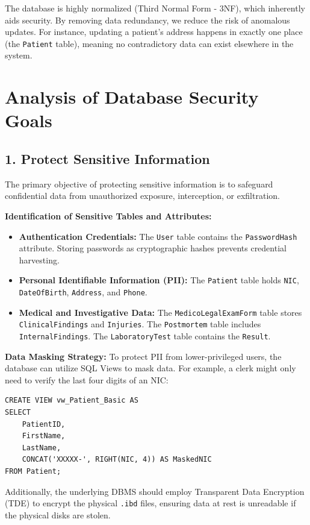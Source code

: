 \documentclass[12pt,a4paper]{article}
\begin{document}
The database is highly normalized (Third Normal Form - 3NF), which inherently aids security. By removing data redundancy, we reduce the risk of anomalous updates. For instance, updating a patient's address happens in exactly one place (the \texttt{Patient} table), meaning no contradictory data can exist elsewhere in the system.

\section{Analysis of Database Security Goals}

\subsection{1. Protect Sensitive Information}
The primary objective of protecting sensitive information is to safeguard confidential data from unauthorized exposure, interception, or exfiltration.

\textbf{Identification of Sensitive Tables and Attributes:}
\begin{itemize}
    \item \textbf{Authentication Credentials:} The \texttt{User} table contains the \texttt{PasswordHash} attribute. Storing passwords as cryptographic hashes prevents credential harvesting.
    \item \textbf{Personal Identifiable Information (PII):} The \texttt{Patient} table holds \texttt{NIC}, \texttt{DateOfBirth}, \texttt{Address}, and \texttt{Phone}.
    \item \textbf{Medical and Investigative Data:} The \texttt{MedicoLegalExamForm} table stores \texttt{ClinicalFindings} and \texttt{Injuries}. The \texttt{Postmortem} table includes \texttt{InternalFindings}. The \texttt{LaboratoryTest} table contains the \texttt{Result}.
\end{itemize}

\textbf{Data Masking Strategy:}
To protect PII from lower-privileged users, the database can utilize SQL Views to mask data. For example, a clerk might only need to verify the last four digits of an NIC:
\begin{lstlisting}[caption={SQL View for Masking Patient NIC}]
CREATE VIEW vw_Patient_Basic AS
SELECT 
    PatientID, 
    FirstName, 
    LastName, 
    CONCAT('XXXXX-', RIGHT(NIC, 4)) AS MaskedNIC 
FROM Patient;
\end{lstlisting}
Additionally, the underlying DBMS should employ Transparent Data Encryption (TDE) to encrypt the physical \texttt{.ibd} files, ensuring data at rest is unreadable if the physical disks are stolen.
\end{document}
